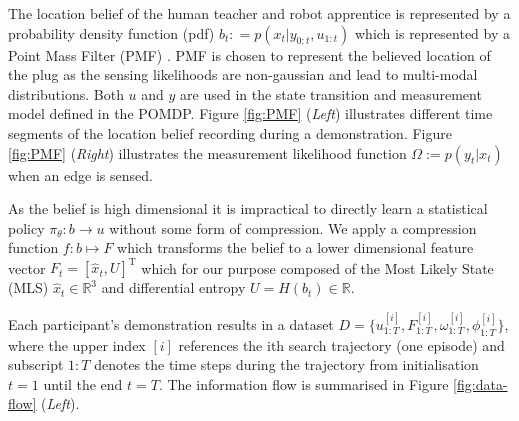 \documentclass[final,5p,times,twocolumn]{elsarticle}
\begin{document}
The location belief of the human teacher and robot apprentice is represented by a probability density function (pdf) ${b_t: = p(x_t|y_{0:t},u_{1:t})}$
which is represented by a Point Mass Filter (PMF) \cite[p.87]{Bergman99recursivebayesian}. PMF is chosen to represent the 
believed location of the plug as the sensing likelihoods are non-gaussian and lead to multi-modal distributions. 
Both $u$ and $y$ are used in the state transition and measurement model defined in the POMDP. Figure \ref{fig:PMF} (\textit{Left}) 
illustrates different time segments of the location belief recording during a demonstration. Figure \ref{fig:PMF} (\textit{Right}) illustrates 
the measurement likelihood function $\Omega := p(y_t|x_t)$ when an edge is sensed. 

As the belief is high dimensional it is impractical to directly learn a statistical policy ${\pi_{\theta} : b \rightarrow u }$ without 
some form of compression. We apply a compression function $f : b \mapsto F$ which transforms the belief to a lower 
dimensional feature vector  $F_t = [\hat{x}_t,U]^{\mathrm{T}}$ which for our purpose composed of 
the Most Likely State (MLS) $\hat{x}_t \in \mathbb{R}^3$ and differential entropy $U = H(b_t) \in \mathbb{R}$.


Each participant's demonstration results in a dataset ${D=\{u^{[i]}_{1:T},F^{[i]}_{1:T},\omega^{[i]}_{1:T},\phi^{[i]}_{1:T}\}}$, 
where the upper index $[i]$ references the ith search trajectory (one episode) and subscript $1:T$ denotes the time 
steps during the trajectory from initialisation $t=1$ until the end $t=T$. The information  flow is summarised in
Figure \ref{fig:data-flow} (\textit{Left}).
\end{document}

